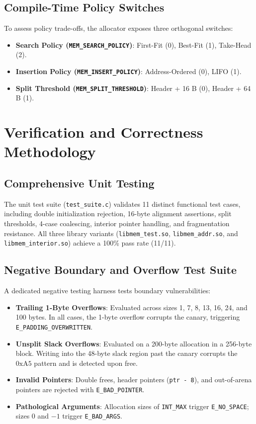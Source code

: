 \documentclass[11pt,a4paper]{article}
\begin{document}
\subsection{Compile-Time Policy Switches}
To assess policy trade-offs, the allocator exposes three orthogonal switches:
\begin{itemize}
    \item \textbf{Search Policy (\texttt{MEM\_SEARCH\_POLICY})}: First-Fit (0), Best-Fit (1), Take-Head (2).
    \item \textbf{Insertion Policy (\texttt{MEM\_INSERT\_POLICY})}: Address-Ordered (0), LIFO (1).
    \item \textbf{Split Threshold (\texttt{MEM\_SPLIT\_THRESHOLD})}: Header + 16 B (0), Header + 64 B (1).
\end{itemize}

\section{Verification and Correctness Methodology}

\subsection{Comprehensive Unit Testing}
The unit test suite (\texttt{test\_suite.c}) validates 11 distinct functional test cases, including double initialization rejection, 16-byte alignment assertions, split thresholds, 4-case coalescing, interior pointer handling, and fragmentation resistance. All three library variants (\texttt{libmem\_test.so}, \texttt{libmem\_addr.so}, and \texttt{libmem\_interior.so}) achieve a 100\% pass rate (11/11).

\subsection{Negative Boundary and Overflow Test Suite}
A dedicated negative testing harness tests boundary vulnerabilities:
\begin{itemize}
    \item \textbf{Trailing 1-Byte Overflows}: Evaluated across sizes 1, 7, 8, 13, 16, 24, and 100 bytes. In all cases, the 1-byte overflow corrupts the canary, triggering \texttt{E\_PADDING\_OVERWRITTEN}.
    \item \textbf{Unsplit Slack Overflows}: Evaluated on a 200-byte allocation in a 256-byte block. Writing into the 48-byte slack region past the canary corrupts the $0\text{xA5}$ pattern and is detected upon free.
    \item \textbf{Invalid Pointers}: Double frees, header pointers (\texttt{ptr - 8}), and out-of-arena pointers are rejected with \texttt{E\_BAD\_POINTER}.
    \item \textbf{Pathological Arguments}: Allocation sizes of \texttt{INT\_MAX} trigger \texttt{E\_NO\_SPACE}; sizes 0 and $-1$ trigger \texttt{E\_BAD\_ARGS}.
\end{itemize}
\end{document}
